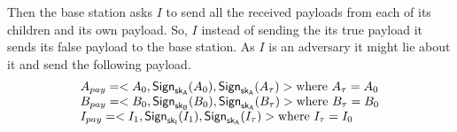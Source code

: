		Then the base station asks $I$ to send all the received payloads from each of its children and its own payload.
		So, $I$ instead of sending the its true payload it sends its false payload to the base station.
		As $I$ is an adversary it might lie about it and send the following payload.
		\begin{equation*}
			\begin{array}{l}
				A_{pay} = <A_{0}, \textsf{Sign}_{\sf{sk}_{A}}(A_{0}), \textsf{Sign}_{\sf{sk}_{A}}(A_{\tau})> \mbox{where}\ A_{\tau} = A_{0}\\
				B_{pay} = <B_{0}, \textsf{Sign}_{\sf{sk}_{B}}(B_{0}), \textsf{Sign}_{\sf{sk}_{A}}(B_{\tau})> \mbox{where}\ B_{\tau} = B_{0}\\
				I_{pay} = <I_{1}, \textsf{Sign}_{\sf{sk}_{I}}(I_{1}), \textsf{Sign}_{\sf{sk}_{A}}(I_{\tau})> \mbox{where}\ I_{\tau} = I_{0}\\
			\end{array}
		\end{equation*}

